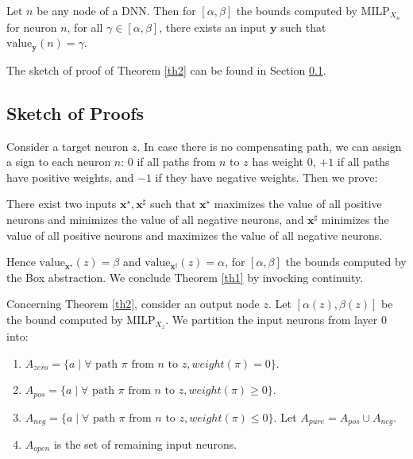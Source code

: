 \documentclass{llncs}
\newcommand{\vx}{\boldsymbol{x}}
\newcommand{\vy}{\boldsymbol{y}}
\newcommand{\val}{{\textrm{value}}}
\newcommand{\MILP}{{\textrm{MILP}}}
\begin{document}
\begin{theorem}
	\label{th2} 
	Let $n$ be any node of a DNN. Then for $[\alpha,\beta]$ the bounds computed by MILP$_{X_n}$ for neuron $n$, for all $\gamma \in [\alpha,\beta]$, there exists an input $\vy$ such that $\val_{\vy}(n)=\gamma$.
\end{theorem}

The sketch of proof of Theorem \ref{th2} can be found in Section \ref{sec.proofs}.


\subsection{Sketch of Proofs}
\label{sec.proofs}

Consider a target neuron $z$.
In case there is no compensating path, we can assign a sign to each neuron $n$: 0
if all paths from $n$ to $z$ has weight 0, $+1$ if all paths have positive weights, and 
$-1$ if they have negative weights. Then we prove:

\begin{proposition}
	\label{prop.sign}
There exist two inputs $\vx^\star,\vx^\sharp$ such that ${\vx^\star}$ maximizes the value of all positive neurons and minimizes the value of all negative neurons, and  ${\vx^\sharp}$ minimizes the value of all positive neurons and maximizes the value of all negative neurons.
\end{proposition}

Hence $\val_{\vx^\star}(z)=\beta$ and $\val_{\vx^\sharp}(z)=\alpha$,
for $[\alpha, \beta]$ the bounds computed by the Box abstraction. We conclude Theorem \ref{th1} by invocking continuity.

\smallskip

Concerning Theorem \ref{th2}, consider an output node $z$.
Let $[\alpha(z),\beta(z)]$ be the bound computed by $\MILP_{X_z}$.
We partition the input neurons from layer $0$ into:
\begin{enumerate}
	\item $A_{zero}= \{a \mid \forall \text{ path $\pi$ from $n$ to } z, weight(\pi)=0\}$.
	\item $A_{pos}= \{a \mid \forall \text{ path $\pi$ from $n$ to } z, weight(\pi)\geq0\}$.
	\item  $A_{neg}= \{a \mid \forall \text{ path $\pi$ from $n$ to } z, weight(\pi)\leq0\}$.
	Let $A_{pure}=A_{pos} \cup A_{neg}$.
	\item $A_{open}$ is the set of remaining input neurons.
\end{enumerate}
\end{document}
